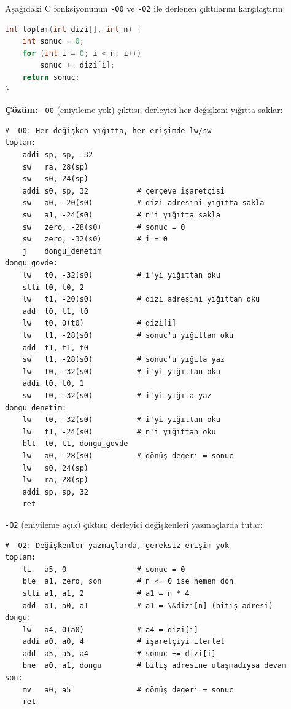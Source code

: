 \begin{ornek}[4.16]
\label{orn:eniyileme}
Aşağıdaki C fonksiyonunun \texttt{-O0} ve \texttt{-O2} ile derlenen çıktılarını karşılaştırın:

\begin{lstlisting}[language=C, style=alistirma-kod]
int toplam(int dizi[], int n) {
    int sonuc = 0;
    for (int i = 0; i < n; i++)
        sonuc += dizi[i];
    return sonuc;
}
\end{lstlisting}

\textbf{Çözüm:} \texttt{-O0} (eniyileme yok) çıktısı; derleyici her değişkeni yığıtta saklar:

\begin{lstlisting}[style=riscv]
# -O0: Her değişken yığıtta, her erişimde lw/sw
toplam:
    addi sp, sp, -32
    sw   ra, 28(sp)
    sw   s0, 24(sp)
    addi s0, sp, 32           # çerçeve işaretçisi
    sw   a0, -20(s0)          # dizi adresini yığıtta sakla
    sw   a1, -24(s0)          # n'i yığıtta sakla
    sw   zero, -28(s0)        # sonuc = 0
    sw   zero, -32(s0)        # i = 0
    j    dongu_denetim
dongu_govde:
    lw   t0, -32(s0)          # i'yi yığıttan oku
    slli t0, t0, 2
    lw   t1, -20(s0)          # dizi adresini yığıttan oku
    add  t0, t1, t0
    lw   t0, 0(t0)            # dizi[i]
    lw   t1, -28(s0)          # sonuc'u yığıttan oku
    add  t1, t1, t0
    sw   t1, -28(s0)          # sonuc'u yığıta yaz
    lw   t0, -32(s0)          # i'yi yığıttan oku
    addi t0, t0, 1
    sw   t0, -32(s0)          # i'yi yığıta yaz
dongu_denetim:
    lw   t0, -32(s0)          # i'yi yığıttan oku
    lw   t1, -24(s0)          # n'i yığıttan oku
    blt  t0, t1, dongu_govde
    lw   a0, -28(s0)          # dönüş değeri = sonuc
    lw   s0, 24(sp)
    lw   ra, 28(sp)
    addi sp, sp, 32
    ret
\end{lstlisting}

\texttt{-O2} (eniyileme açık) çıktısı; derleyici değişkenleri yazmaçlarda tutar:

\begin{lstlisting}[style=riscv]
# -O2: Değişkenler yazmaçlarda, gereksiz erişim yok
toplam:
    li   a5, 0                # sonuc = 0
    ble  a1, zero, son        # n <= 0 ise hemen dön
    slli a1, a1, 2            # a1 = n * 4
    add  a1, a0, a1           # a1 = \&dizi[n] (bitiş adresi)
dongu:
    lw   a4, 0(a0)            # a4 = dizi[i]
    addi a0, a0, 4            # işaretçiyi ilerlet
    add  a5, a5, a4           # sonuc += dizi[i]
    bne  a0, a1, dongu        # bitiş adresine ulaşmadıysa devam
son:
    mv   a0, a5               # dönüş değeri = sonuc
    ret
\end{lstlisting}


\end{ornek}
